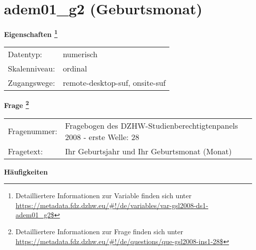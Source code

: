 
    \setcounter{footnote}{0}

    \vspace*{-1.8cm}
	\section{adem01\_g2 (Geburtsmonat)}
	\label{section:adem01_g2}



    \vspace*{0.5cm}
    \noindent\textbf{Eigenschaften
	\footnote{Detailliertere Informationen zur Variable finden sich unter
		\url{https://metadata.fdz.dzhw.eu/\#!/de/variables/var-gsl2008-ds1-adem01_g2$}}}\\
	\begin{tabularx}{\hsize}{@{}lX}
	Datentyp: & numerisch \\
	Skalenniveau: & ordinal \\
	Zugangswege: &
	  remote-desktop-suf, 
	  onsite-suf
 \\
    \end{tabularx}



				\vspace*{0.5cm}
                \noindent\textbf{Frage
	                \footnote{Detailliertere Informationen zur Frage finden sich unter
		              \url{https://metadata.fdz.dzhw.eu/\#!/de/questions/que-gsl2008-ins1-28$}}}\\
				\begin{tabularx}{\hsize}{@{}lX}
					Fragenummer: &
					  Fragebogen des DZHW-Studienberechtigtenpanels 2008 - erste Welle:
					  28
 \\
					Fragetext: & Ihr Geburtsjahr und Ihr Geburtsmonat (Monat) \\
				\end{tabularx}





        		\vspace*{0.5cm}
                \noindent\textbf{Häufigkeiten}

